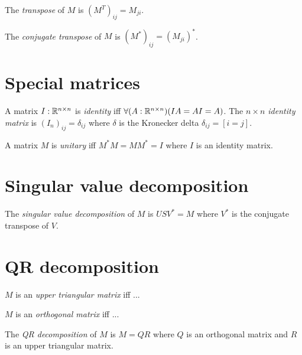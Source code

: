 The
%
%
%
\emph{transpose} of \(M\) is \((M^T)_{ij} = M_{ji}\).

The
%
%
%
%
\emph{conjugate transpose} of \(M\) is \((M^*)_{ij} = (M_{ji})^*\).

\section{Special matrices}

%
%
A matrix \(I : \mathbb{R}^{n \times n}\) is \emph{identity} iff
\(\forall (A : \mathbb{R}^{n \times n}) (IA = AI = A)\).
The \emph{\(n\times n\) identity matrix} is
\((I_n)_{ij} = \delta_{ij}\) where \(\delta\) is the
%
Kronecker delta \(\delta_{ij} = [i=j]\).

A matrix \(M\) is
%
%
\emph{unitary} iff \(M^*M = MM^* = I\)
where \(I\) is an identity matrix.

\section{Singular value decomposition}

The
%
%
\emph{singular value decomposition} of \(M\) is \(U S V^* = M\) where \(V^*\) is the conjugate transpose of \(V\).

\section{QR decomposition}

\(M\) is an
%
%
\emph{upper triangular matrix} iff ...

\(M\) is an
%
%
\emph{orthogonal matrix} iff ...

The
%
%
\emph{QR decomposition} of \(M\) is \(M = QR\) where
\(Q\) is an orthogonal matrix and
\(R\) is an upper triangular matrix.
